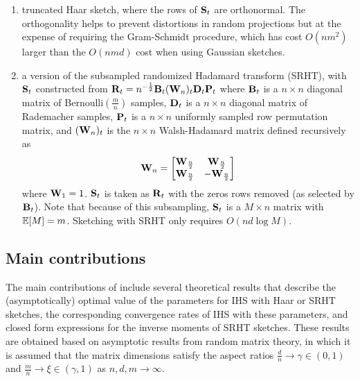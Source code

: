 \begin{enumerate}

\item
truncated Haar sketch, where the rows of $\mathbf{S}_t$ are orthonormal. The orthogonality helps to prevent distortions in random projections but at the expense of requiring the Gram-Schmidt procedure, which has cost $O(nm^2)$ larger than the $O(nmd)$ cost when using Gaussian sketches.

\item
a version of the subsampled randomized Hadamard transform (SRHT), with $\mathbf{S}_t$ constructed from $\mathbf{R}_t=n^{-\frac{1}{2}}\mathbf{B}_t(\mathbf{W}_n)_t\mathbf{D}_t\mathbf{P}_t$ where $\mathbf{B}_t$ is a $n\times n$ diagonal matrix of \iid Bernoulli$\left(\frac{m}{n}\right)$ samples, $\mathbf{D}_t$ is a $n\times n$ diagonal matrix of \iid Rademacher samples, $\mathbf{P}_t$ is a $n\times n$ uniformly sampled row permutation matrix, and $(\mathbf{W}_n)_t$ is the $n\times n$ Walsh-Hadamard matrix defined recursively as
\[
\mathbf{W}_n =
\begin{bmatrix}
\mathbf{W}_\frac{n}{2} & \mathbf{W}_\frac{n}{2} \\
\mathbf{W}_\frac{n}{2} & -\mathbf{W}_\frac{n}{2}
\end{bmatrix}
\]
where $\mathbf{W}_1=1$. $\mathbf{S}_t$ is taken as $\mathbf{R}_t$ with the zeros rows removed (as selected by $\mathbf{B}_t$). Note that because of this subsampling, $\mathbf{S}_t$ is a $M\times n$ matrix with $\mathbb{E}[M]=m$. Sketching with SRHT only requires $O(nd\log M)$.

\end{enumerate}

\subsection{Main contributions}

The main contributions of \citet{Lacotte:2020} include several theoretical results that describe the (asymptotically) optimal value of the parameters for IHS with Haar or SRHT sketches, the corresponding convergence rates of IHS with these parameters, and closed form expressions for the inverse moments of SRHT sketches. These results are obtained based on asymptotic results from random matrix theory, in which it is assumed that the matrix dimensions satisfy the aspect ratios $\frac{d}{n}\rightarrow\gamma\in(0,1)$ and $\frac{m}{n}\rightarrow\xi\in(\gamma,1)$ as $n,d,m\rightarrow\infty$.
\\

